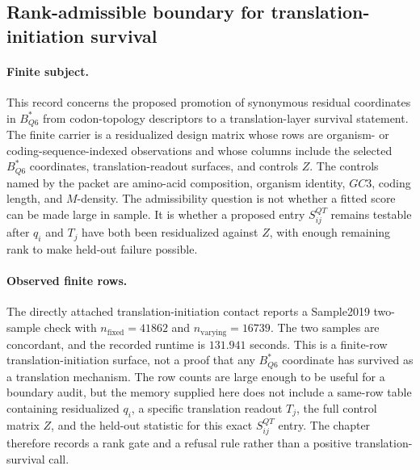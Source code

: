 \subsection{Rank-admissible boundary for translation-initiation survival}\label{sec:biorank-uorf-kozak-ribosome-load-sample2019}

\paragraph{Finite subject.}
This record concerns the proposed promotion of synonymous residual coordinates in $B^{*}_{Q6}$ from codon-topology descriptors to a translation-layer survival statement. The finite carrier is a residualized design matrix whose rows are organism- or coding-sequence-indexed observations and whose columns include the selected $B^{*}_{Q6}$ coordinates, translation-readout surfaces, and controls $Z$. The controls named by the packet are amino-acid composition, organism identity, $GC3$, coding length, and $M$-density. The admissibility question is not whether a fitted score can be made large in sample. It is whether a proposed entry $S^{QT}_{ij}$ remains testable after $q_i$ and $T_j$ have both been residualized against $Z$, with enough remaining rank to make held-out failure possible.

\paragraph{Observed finite rows.}
The directly attached translation-initiation contact reports a Sample2019 two-sample check with $n_{\mathrm{fixed}}=41862$ and $n_{\mathrm{varying}}=16739$. The two samples are concordant, and the recorded runtime is $131.941$ seconds. This is a finite-row translation-initiation surface, not a proof that any $B^{*}_{Q6}$ coordinate has survived as a translation mechanism. The row counts are large enough to be useful for a boundary audit, but the memory supplied here does not include a same-row table containing residualized $q_i$, a specific translation readout $T_j$, the full control matrix $Z$, and the held-out statistic for this exact $S^{QT}_{ij}$ entry. The chapter therefore records a rank gate and a refusal rule rather than a positive translation-survival call.

